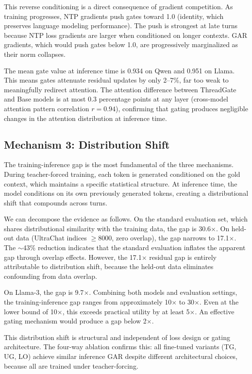 \documentclass[11pt,a4paper]{article}
\begin{document}
This reverse conditioning is a direct consequence of gradient competition. As training progresses, NTP gradients push gates toward 1.0 (identity, which preserves language modeling performance). The push is strongest at late turns because NTP loss gradients are larger when conditioned on longer contexts. GAR gradients, which would push gates below 1.0, are progressively marginalized as their norm collapses.

The mean gate value at inference time is 0.934 on Qwen and 0.951 on Llama. This means gates attenuate residual updates by only 2--7\%, far too weak to meaningfully redirect attention. The attention difference between ThreadGate and Base models is at most 0.3 percentage points at any layer (cross-model attention pattern correlation $r = 0.94$), confirming that gating produces negligible changes in the attention distribution at inference time.

\subsection{Mechanism 3: Distribution Shift}

The training-inference gap is the most fundamental of the three mechanisms. During teacher-forced training, each token is generated conditioned on the gold context, which maintains a specific statistical structure.
At inference time, the model conditions on its own previously generated tokens, creating a distributional shift that compounds across turns.

We can decompose the evidence as follows. On the standard evaluation set, which shares distributional similarity with the training data, the gap is 30.6$\times$. On held-out data (UltraChat indices $\geq 8000$, zero overlap), the gap narrows to 17.1$\times$. The $\sim$43\% reduction indicates that the standard evaluation inflates the apparent gap through overlap effects. However, the 17.1$\times$ residual gap is entirely attributable to distribution shift, because the held-out data eliminates confounding from data overlap.

On Llama-3, the gap is 9.7$\times$. Combining both models and evaluation settings, the training-inference gap ranges from approximately 10$\times$ to 30$\times$. Even at the lower bound of 10$\times$, this exceeds practical utility by at least 5$\times$. An effective gating mechanism would produce a gap below 2$\times$.

This distribution shift is structural and independent of loss design or gating architecture. The four-way ablation confirms this: all fine-tuned variants (TG, UG, LO) achieve similar inference GAR despite different architectural choices, because all are trained under teacher-forcing.
\end{document}
